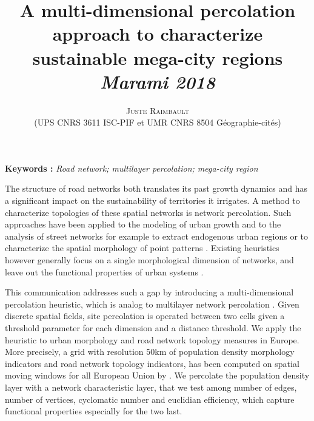 \documentclass[12pt]{article}
\newcommand{\noun}[1]{\textsc{#1}}
\begin{document}
\title{
A multi-dimensional percolation approach to characterize sustainable mega-city regions
\medskip\\
\textit{Marami 2018
}
}
\author{\noun{Juste Raimbault}\medskip\\
(UPS CNRS 3611 ISC-PIF et UMR CNRS 8504 Géographie-cités)\\
}
\date{}

\maketitle

\justify



\textbf{Keywords : }\textit{Road network; multilayer percolation; mega-city region}

\medskip

The structure of road networks both translates its past growth dynamics and has a significant impact on the sustainability of territories it irrigates. A method to characterize topologies of these spatial networks is network percolation. Such approaches have been applied to the modeling of urban growth \citep{makse1998modeling} and to the analysis of street networks for example to extract endogenous urban regions \citep{arcaute2016cities} or to characterize the spatial morphology of point patterns \cite{huynh2018characterisation}. Existing heuristics however generally focus on a single morphological dimension of networks, and leave out the functional properties of urban systems \citep{burger2012form}.

This communication addresses such a gap by introducing a multi-dimensional percolation heuristic, which is analog to multilayer network percolation \citep{boccaletti2014structure}. Given discrete spatial fields, site percolation is operated between two cells given a threshold parameter for each dimension and a distance threshold. We apply the heuristic to urban morphology and road network topology measures in Europe. More precisely, a grid with resolution 50km of population density morphology indicators and road network topology indicators, has been computed on spatial moving windows for all European Union by \cite{raimbault2018urban}. We percolate the population density layer with a network characteristic layer, that we test among number of edges, number of vertices, cyclomatic number and euclidian efficiency, which capture functional properties especially for the two last.
\end{document}
